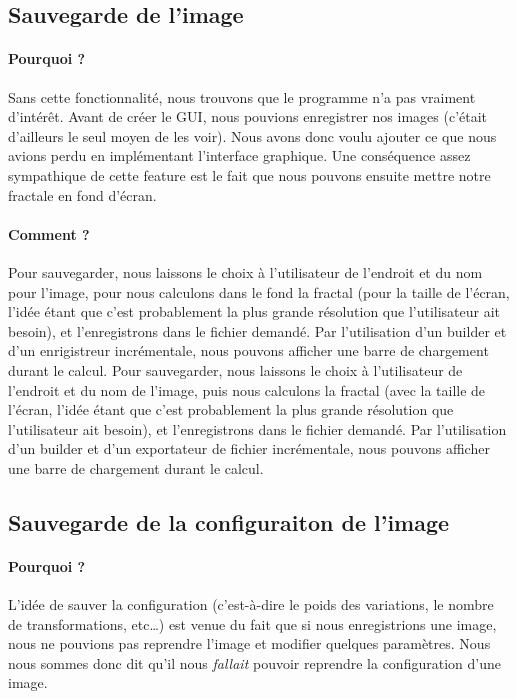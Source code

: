 \documentclass[a4paper]{report}
\begin{document}
\subsection*{Sauvegarde de l'image}
\paragraph{Pourquoi ?}
Sans cette fonctionnalité, nous trouvons que le programme n'a pas vraiment d'intérêt. Avant de créer le GUI, nous pouvions enregistrer nos images (c'était d'ailleurs le seul moyen de les voir). Nous avons donc voulu ajouter ce que nous avions perdu en implémentant l'interface graphique. Une conséquence assez sympathique de cette feature est le fait que nous pouvons ensuite mettre notre fractale en fond d'écran.

\paragraph{Comment ?}
Pour sauvegarder, nous laissons le choix à l'utilisateur de l'endroit et du nom pour l'image, pour nous calculons dans le fond la fractal (pour la taille de l'écran, l'idée étant que c'est probablement la plus grande résolution que l'utilisateur ait besoin), et l'enregistrons dans le fichier demandé. Par l'utilisation d'un builder et d'un enrigistreur incrémentale, nous pouvons afficher une barre de chargement durant le calcul.
Pour sauvegarder, nous laissons le choix à l'utilisateur de l'endroit et du nom de l'image, puis nous calculons la fractal (avec la taille de l'écran, l'idée étant que c'est probablement la plus grande résolution que l'utilisateur ait besoin), et l'enregistrons dans le fichier demandé. Par l'utilisation d'un builder et d'un exportateur de fichier incrémentale, nous pouvons afficher une barre de chargement durant le calcul.

\subsection*{Sauvegarde de la configuraiton de l'image}
\paragraph{Pourquoi ?}
L'idée de sauver la configuration (c'est-à-dire le poids des variations, le nombre de transformations, etc\ldots) est venue du fait que si nous enregistrions une image, nous ne pouvions pas reprendre l'image et modifier quelques paramètres. Nous nous sommes donc dit qu'il nous \textit{fallait} pouvoir reprendre la configuration d'une image.
\end{document}
